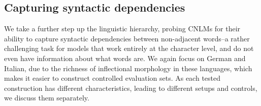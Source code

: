\subsection{Capturing syntactic dependencies}
\label{sec:dependencies}



We take a further step up the linguistic hierarchy, probing CNLMs for their ability to capture syntactic dependencies between non-adjacent words--a rather challenging task for models that work entirely at the character level, and do not even have information about what words are. We again focus on German and Italian, due to the richness of inflectional morphology in these languages, which makes it easier to construct controlled evaluation sets. As each tested construction has different characteristics, leading to different setups and controls, we discuss them separately. 





